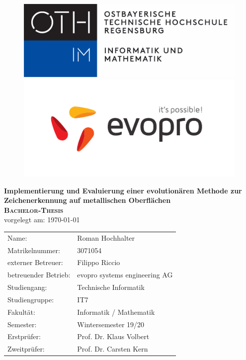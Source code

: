 \begin{titlepage}
		\begin{figure}[!htb]
			\begin{minipage}{0.48\textwidth}
				
				\includegraphics[width=0.8\linewidth]{oth-regensburg-logo}
			\end{minipage}
			\hfill
			\begin{minipage}{0.48\textwidth}
				\flushright
				\includegraphics[width=0.5\linewidth]{evopro_logo_cmyk}
			\end{minipage}
		\end{figure}
		
		\vspace*{0.5cm}
		
		\begin{center}
			\huge \textbf{\textsf{Implementierung und Evaluierung einer evolutionären Methode zur Zeichenerkennung auf metallischen Oberflächen}} \\
			\vspace{5cm}
			\huge\textbf{\textsc{Bachelor-Thesis}} \\
			\vspace{1cm}
			\normalsize{vorgelegt am: \today} \\
			\vspace{2.5cm}
			\vspace{3cm}
			\normalsize{
				\begin{tabular}{ll}
					Name: & {Roman Hochhalter} \\
					Matrikelnummer: & {3071054} \\
					externer Betreuer: & Filippo Riccio \\
					betreuender Betrieb: & evopro systems engineering AG \\
					Studiengang: & Technische Informatik \\
					Studiengruppe: & IT7 \\
					Fakultät: & Informatik / Mathematik \\
					Semester: & Wintersemester 19/20 \\
					Erstprüfer: & {Prof. Dr. Klaus Volbert} \\
					Zweitprüfer: & {Prof. Dr. Carsten Kern} \\
				\end{tabular}
			}
		\end{center}
	\end{titlepage}
